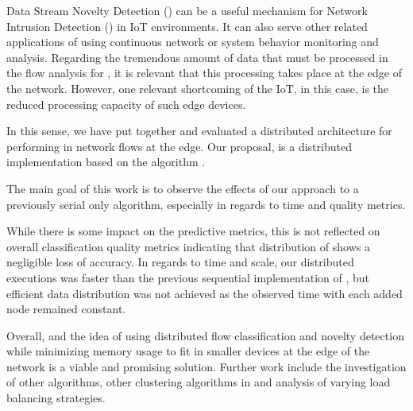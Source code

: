 Data Stream Novelty Detection (\nd) can be a useful mechanism for Network
Intrusion Detection (\nids) in IoT environments.
It can also serve other related applications of \nd using continuous network or
system behavior monitoring and analysis.
Regarding the tremendous amount of data that must be processed in the flow
analysis for \nd, it is relevant that this processing takes place at the edge of
the network.
However, one relevant shortcoming of the IoT, in this case, is the reduced
processing capacity of such edge devices.

In this sense, we have put together and evaluated a distributed architecture for
performing \nd in network flows at the edge.
Our proposal, \mfog is a distributed \nd implementation based on the \nd
algorithm \minas.

The main goal of this work is to observe the effects of our approach to a
previously serial only algorithm, especially in regards to time and quality
metrics.

While there is some impact on the predictive metrics, this is not reflected on
overall classification quality metrics indicating that distribution of \minas
shows a negligible loss of accuracy.
In regards to time and scale, our distributed executions was faster than the
previous sequential implementation of \minas, but efficient data distribution
was not achieved as the observed time with each added node remained constant.

Overall, \mfog and the idea of using distributed flow classification and novelty
detection while minimizing memory usage to fit in smaller devices at the edge of
the network is a viable and promising solution.
Further work include the investigation of other \nd algorithms, other clustering
algorithms in \minas and analysis of varying load balancing strategies.






